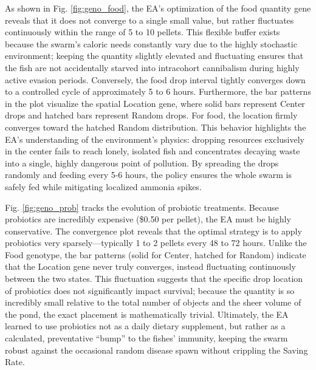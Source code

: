 \documentclass[conference]{IEEEtran}
\begin{document}
As shown in Fig. \ref{fig:geno_food}, the EA's optimization of the food quantity gene reveals that it does not converge to a single small value, but rather fluctuates continuously within the range of 5 to 10 pellets. This flexible buffer exists because the swarm's caloric needs constantly vary due to the highly stochastic environment; keeping the quantity slightly elevated and fluctuating ensures that the fish are not accidentally starved into intracohort cannibalism during highly active evasion periods. Conversely, the food drop interval tightly converges down to a controlled cycle of approximately 5 to 6 hours. Furthermore, the bar patterns in the plot visualize the spatial Location gene, where solid bars represent Center drops and hatched bars represent Random drops. For food, the location firmly converges toward the hatched Random distribution. This behavior highlights the EA's understanding of the environment's physics: dropping resources exclusively in the center fails to reach lonely, isolated fish and concentrates decaying waste into a single, highly dangerous point of pollution. By spreading the drops randomly and feeding every 5-6 hours, the policy ensures the whole swarm is safely fed while mitigating localized ammonia spikes.

Fig. \ref{fig:geno_prob} tracks the evolution of probiotic treatments. Because probiotics are incredibly expensive (\$0.50 per pellet), the EA must be highly conservative. The convergence plot reveals that the optimal strategy is to apply probiotics very sparsely—typically 1 to 2 pellets every 48 to 72 hours. Unlike the Food genotype, the bar patterns (solid for Center, hatched for Random) indicate that the Location gene never truly converges, instead fluctuating continuously between the two states. This fluctuation suggests that the specific drop location of probiotics does not significantly impact survival; because the quantity is so incredibly small relative to the total number of objects and the sheer volume of the pond, the exact placement is mathematically trivial. Ultimately, the EA learned to use probiotics not as a daily dietary supplement, but rather as a calculated, preventative ``bump'' to the fishes' immunity, keeping the swarm robust against the occasional random disease spawn without crippling the Saving Rate.
\end{document}

